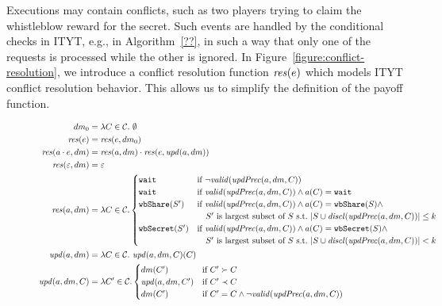 %
Executions may contain conflicts, such as two players trying to claim the whistleblow reward for the secret.
%
Such events are handled by the conditional checks in ITYT, e.g., in Algorithm~\ref{??}, in such a way that only one of the requests is processed while the other is ignored.
%
In Figure~\ref{figure:conflict-resolution}, we introduce a conflict resolution function $\mathit{res}(e)$ which models ITYT conflict resolution behavior. 
%
This allows us to simplify the definition of the payoff function.



\begin{figure*}
\begin{align*}
	dm_0 &= \lambda C \in \coalitionSchema.\ \emptyset\\
	\conflict{e} &= \conflictExec{e}{dm_0}\\
	\conflictExec{a \concat e}{dm} &= \conflictAction{a}{dm} \concat \conflictExec{e}{\updateDM{a}{dm}}\\
	\conflictExec{\emptysequence}{dm} &= \emptysequence\\
	\conflictAction{a}{dm} & =  \lambda C \in \coalitionSchema.
	\begin{cases}
		\wait & \text{if}\ \neg \valid{\updPrec{a}{dm}{C}}\\
		\wait & \text{if}\ \valid{\updPrec{a}{dm}{C}} \wedge a(C) = \wait \\
		\wShare{S'} & \text{if}\ \valid{\updPrec{a}{dm}{C}} \wedge a(C) = \wShare{S} \wedge \\
		& \quad S'\ \text{is largest subset of}\ S\ \text{s.t.}\ |S \cup \disclosed{\updPrec{a}{dm}{C}}| \leq k \\
		\wSecret{S'} & \text{if}\ \valid{\updPrec{a}{dm}{C}} \wedge a(C) = \wSecret{S} \wedge \\
		& \quad S'\ \text{is largest subset of}\ S\ \text{s.t.}\ |S \cup \disclosed{\updPrec{a}{dm}{C}}| < k 
	\end{cases}
	\\
	\updateDM{a}{dm} & = \lambda C \in \coalitionSchema.\ \partialUpdateDM{a}{dm}{C}(C) \\
	\partialUpdateDM{a}{dm}{C}& = \lambda C' \in \coalitionSchema.
	\begin{cases}
 		dm(C') & \text{if}\ C' \succ C \\
 		\partialUpdateDM{a}{dm}{C'} & \text{if}\ C' \prec C\\
 		dm(C') &  \text{if}\ C' = C \wedge \neg \valid{\updPrec{a}{dm}{C}}  \\	

\end{cases}
\end{align*}
\end{figure*}
